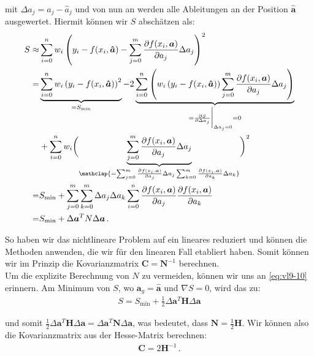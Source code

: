 mit $\Delta a_j = a_j - \hat{a}_j$ und von nun an werden alle Ableitungen an der Position $\boldsymbol{\hat{a}}$ ausgewertet. Hiermit k\"onnen wir $S$ absch\"atzen als:
\begin{align}
\begin{split}
S \approx& \sum_{i=0}^n w_i \left( y_i - f(x_i, \boldsymbol{\hat{a}}) - \sum_{j=0}^m \frac{ \partial f(x_i, \boldsymbol{a}) }{ \partial a_j } \Delta a_j \right)^2\\
=& \underbrace{\sum_{i=0}^n w_i \left( y_i - f(x_i, \boldsymbol{\hat{a}}) \right)^2}_{= S_\text{min}} - 2 \underbrace{\sum_{i=0}^n \left( w_i \left( y_i - f(x_i, \boldsymbol{\hat{a}}) \right) \sum_{j=0}^m \frac{ \partial f(x_i, \boldsymbol{a}) }{ \partial a_j } \Delta a_j \right)}_{= \frac{ \partial S }{ \partial \Delta a_j} \bigg|_{\Delta a_j = 0} = 0}\\
&+ \sum_{i=0}^n w_i \biggl( {\underbrace{\sum_{j=0}^m \frac{ \partial f(x_i, \boldsymbol{a}) }{ \partial a_j } \Delta a_j}_{\mathclap{= \sum_{j=0}^m \frac{ \partial f(x_i, \boldsymbol{a}) }{ \partial a_j } \Delta a_j \sum_{k=0}^m \frac{ \partial f(x_i, \boldsymbol{a}) }{ \partial a_k } \Delta a_k}}} \biggr)^2\\
=& S_\text{min} + \sum_{j=0}^m \sum_{k=0}^m \Delta a_j \Delta a_k \sum_{i=0}^n \frac{ \partial f(x_i, \boldsymbol{a}) }{ \partial a_j } \frac{ \partial f(x_i, \boldsymbol{a}) }{ \partial a_k }\\
=& S_\text{min} + \Delta \boldsymbol{a}^T N \Delta \boldsymbol{a}\,.
\label{eq:vl9-21}
\end{split}
\end{align}

So haben wir das nichtlineare Problem auf ein lineares reduziert und k\"onnen die Methoden anwenden, die wir f\"ur den linearen Fall etabliert haben. Somit k\"onnen wir im Prinzip die Kovarianzmatrix $\boldsymbol{C} = \boldsymbol{N}^{-1}$ berechnen.\\[0.3cm]
Um die explizite Berechnung von $N$ zu vermeiden, k\"onnen wir uns an \cref{eq:vl9-10} erinnern. Am Minimum von $S$, wo $\boldsymbol{a}_g = \boldsymbol{\hat{a}}$ und $\nabla S = 0$, wird das zu:
\begin{align}
S = S_\text{min} + \frac{1}{2} \Delta \boldsymbol{a}^T \boldsymbol{H} \Delta \boldsymbol{a}
\label{eq:vl9-22}
\end{align}

und somit $\frac{1}{2} \Delta \boldsymbol{a}^T \boldsymbol{H} \Delta \boldsymbol{a} = \Delta \boldsymbol{a}^T \boldsymbol{N} \Delta \boldsymbol{a}$, was bedeutet, dass $\boldsymbol{N} = \frac{1}{2} \boldsymbol{H}$. Wir k\"onnen also die Kovarianzmatrix aus der Hesse-Matrix berechnen:
\begin{align}
\boldsymbol{C} = 2 \boldsymbol{H}^{-1}\,.
\label{eq:vl9-23}
\end{align}


